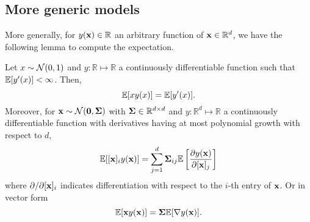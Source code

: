 \documentclass[11pt]{article}
\begin{document}
\subsection{More generic models}

More generally, for $y(\mathbf x) \in \mathbb R$ an arbitrary function of $\mathbf x \in \mathbb R^d$, we have the following lemma to compute the expectation.

\begin{lemma}\label{lem:stein}
Let $x \sim \mathcal{N}(0,1)$ and $y: \mathbb R \mapsto \mathbb R$ a continuously differentiable function such that $\mathbb E[y'(x)] < \infty$. Then,
\begin{equation}
  \mathbb E[x y(x)] = \mathbb E[y'(x)].
\end{equation}
Moreover, for $\mathbf x \sim \mathcal{N}(\mathbf 0, \mathbf{\Sigma})$ with $\mathbf{\Sigma} \in \mathbb R^{d \times d}$ and $y: \mathbb R^d \mapsto \mathbb R$ a continuously differentiable function with derivatives having at most polynomial growth with respect to $d$,
\begin{equation}
  \mathbb E[[\mathbf x]_i y(\mathbf x)] = \sum_{j=1}^d \mathbf{\Sigma}_{ij} \mathbb E \left[ \frac{\partial y(\mathbf x)}{\partial [\mathbf x]_j} \right]
\end{equation}
where $\partial/\partial [\mathbf x]_i$ indicates differentiation with respect to the $i$-th entry of $\mathbf x$. Or in vector form
\[
  \mathbb E[\mathbf x y(\mathbf x)] = \mathbf{\Sigma} \mathbb E[\nabla y(\mathbf x)].
\]
\end{lemma}



\end{document}
